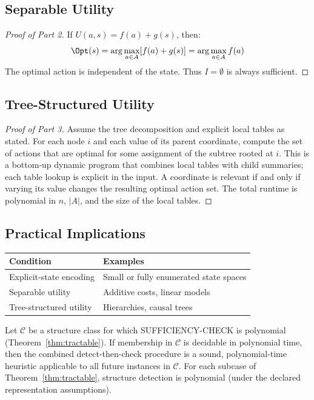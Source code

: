 \subsection{Separable Utility}

\begin{proof}[Proof of Part 2]
If $U(a, s) = f(a) + g(s)$, then:
\[
\Opt(s) = \arg\max_{a \in A} [f(a) + g(s)] = \arg\max_{a \in A} f(a)
\]
The optimal action is independent of the state. Thus $I = \emptyset$ is always sufficient.
\end{proof}

\subsection{Tree-Structured Utility}

\begin{proof}[Proof of Part 3]
Assume the tree decomposition and explicit local tables as stated. For each node $i$ and each value of its parent coordinate, compute the set of actions that are optimal for some assignment of the subtree rooted at $i$. This is a bottom-up dynamic program that combines local tables with child summaries; each table lookup is explicit in the input. A coordinate is relevant if and only if varying its value changes the resulting optimal action set. The total runtime is polynomial in $n$, $|A|$, and the size of the local tables.
\end{proof}

\subsection{Practical Implications}

\begin{center}
\begin{tabular}{ll}
\toprule
\textbf{Condition} & \textbf{Examples} \\
\midrule
Explicit-state encoding & Small or fully enumerated state spaces \\
Separable utility & Additive costs, linear models \\
Tree-structured utility & Hierarchies, causal trees \\
\bottomrule
\end{tabular}
\end{center}

\begin{proposition}\label{prop:heuristic-reusability}
Let $\mathcal{C}$ be a structure class for which SUFFICIENCY-CHECK is polynomial (Theorem~\ref{thm:tractable}). If membership in $\mathcal{C}$ is decidable in polynomial time, then the combined detect-then-check procedure is a sound, polynomial-time heuristic applicable to all future instances in $\mathcal{C}$.
For each subcase of Theorem~\ref{thm:tractable}, structure detection is polynomial (under the declared representation assumptions).
\end{proposition}

